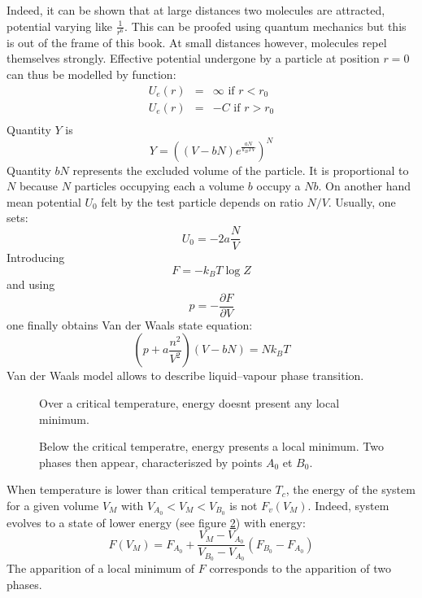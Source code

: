 \documentclass[12pt]{book}
\begin{document}
Indeed, it can be shown that at large distances two molecules are attracted,
potential varying like $\frac{1}{r^6}$. This can be proofed using quantum
mechanics but this is out of the frame of this book.
At small distances however, molecules repel themselves strongly. Effective
potential undergone by a particle at position $r=0$ can thus be modelled by
function:
\begin{eqnarray}
U_e(r)&=&\infty  \mbox{ if }  r<r_0\\
U_e(r)&=&-C \mbox{ if } r>r_0\\
\end{eqnarray}
Quantity $Y$ is
\begin{equation}
Y=\left((V-bN)e^{\frac{aN}{k_BTV}}\right)^N
\end{equation}
Quantity $bN$ represents the excluded volume of the particle. It is
proportional to $N$ because $N$ particles occupying each a  
volume $b$ occupy a $Nb$. On another hand mean potential $U_0$ felt by the
test particle depends on ratio $N/V$. Usually, one  sets:
\begin{equation}
U_0=-2a\frac{N}{V}
\end{equation}
Introducing
\begin{equation}
F=-k_BT\log Z
\end{equation}
and using
\begin{equation}
p=-\frac{\partial F}{\partial V}
\end{equation}
one finally obtains Van der Waals state equation:
\begin{equation}
\left(p+a\frac{n^2}{V^2}\right)(V-bN)=Nk_BT
\end{equation}
Van der Waals model allows to describe liquid--vapour phase transition.
\begin{figure}[htb]
 \centerline{}   
 \caption{Over a critical temperature, energy doesnt present any local
   minimum.} 
 \label{figvanavant}
\end{figure}
\begin{figure}[htb]
 \centerline{}   
 \caption{Below the critical temperatre, energy presents a local minimum. Two
   phases then appear, characteriszed by points $A_{0}$ et $B_0$.}
 \label{figvanapres}
\end{figure}
When temperature is lower than critical temperature $T_c$, the energy of the
system for a given volume $V_M$ with $V_{A_0}<V_M<V_{B_0}$ is not
$F_v(V_M)$. Indeed, system evolves to a state of lower energy (see figure
\ref{figvanapres}) with energy:  
\begin{equation}
F(V_M)=F_{A_0}+\frac{V_M-V_{A_0}}{V_{B_0}-V_{A_0}}(F_{B_0}-F_{A_0})
\end{equation}
The apparition of a local minimum of $F$ corresponds to the apparition of two
phases. 
\end{document}
